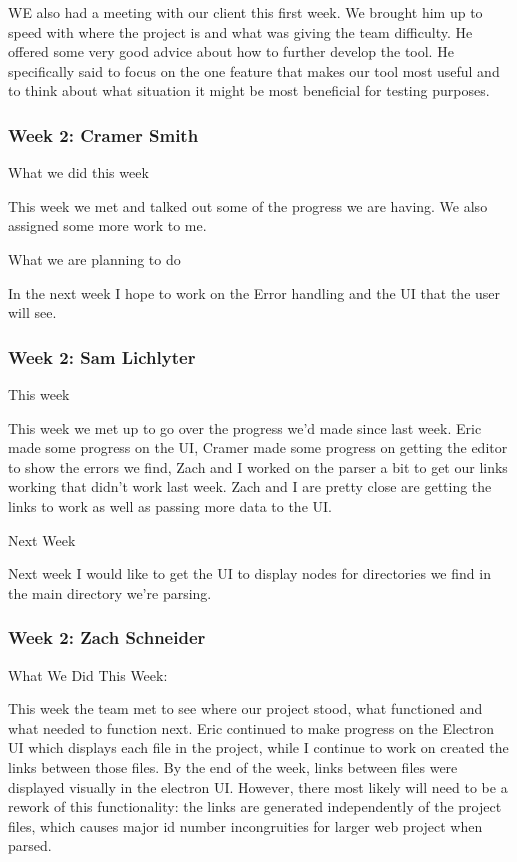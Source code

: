 WE also had a meeting with our client this first week. We brought him up to speed with where the project is and what was giving the team difficulty. He offered some very good advice about how to further develop the tool. He specifically said to focus on the one feature that makes our tool most useful and to think about what situation it might be most beneficial for testing purposes. \\ 

 \subsubsection{Week 2: Cramer Smith}

What we did this week



This week we met and talked out some of the progress we are having. We also assigned some more work to me.



What we are planning to do



In the next week I hope to work on the Error handling and the UI that the user will see. \\ 

 \subsubsection{Week 2: Sam Lichlyter}

This week

This week we met up to go over the progress we'd made since last week. Eric made some progress on the UI, Cramer made some progress on getting the editor to show the errors we find, Zach and I worked on the parser a bit to get our links working that didn't work last week. Zach and I are pretty close are getting the links to work as well as passing more data to the UI.



Next Week

Next week I would like to get the UI to display nodes for directories we find in the main directory we're parsing.  \\ 

 \subsubsection{Week 2: Zach Schneider}

What We Did This Week:

This week the team met to see where our project stood, what functioned and what needed to function next. Eric continued to make progress on the Electron UI which displays each file in the project, while I continue to work on created the links between those files. By the end of the week, links between files were displayed visually in the electron UI. However, there most likely will need to be a rework of this functionality: the links are generated independently of the project files, which causes major id number incongruities for larger web project when parsed.



